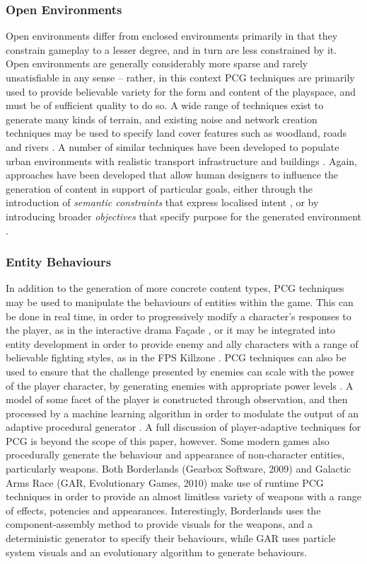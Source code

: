 \documentclass{acm_proc_article-sp}
\begin{document}
\subsubsection{Open Environments}
Open environments differ from enclosed environments primarily in that they constrain gameplay to a lesser degree, and in turn are less constrained by it. Open environments are generally considerably more sparse and rarely unsatisfiable in any sense -- rather, in this context PCG techniques are primarily used to provide believable variety for the form and content of the playspace, and must be of sufficient quality to do so. A wide range of techniques exist to generate many kinds of terrain, and existing noise and network creation techniques may be used to specify land cover features such as woodland, roads and rivers \cite{raffe2012survey,perlin2002improving}. A number of similar techniques have been developed to populate urban environments with realistic transport infrastructure and buildings \cite{carli2011survey}. Again, approaches have been developed that allow human designers to influence the generation of content in support of particular goals, either through the introduction of \textit{semantic constraints} that express localised intent \cite{smelik2011semantic}, or by introducing broader \textit{objectives} that specify purpose for the generated environment \cite{togelius2010towards}.


\subsubsection{Entity Behaviours}
\label{sec:GAR1}
In addition to the generation of more concrete content types, PCG techniques may be used to manipulate the behaviours of entities within the game. This can be done in real time, in order to progressively modify a character's responses to the player, as in the interactive drama Fa{\c{c}}ade \cite{mateas2007writing}, or it may be integrated into entity development in order to provide enemy and ally characters with a range of believable fighting styles, as in the FPS Killzone \cite{straatman2005killzone}.
PCG techniques can also be used to ensure that the challenge presented by enemies can scale with the power of the player character, by generating enemies with appropriate power levels \cite{hamlet}. A model of some facet of the player is constructed through observation, and then processed by a machine learning algorithm in order to modulate the output of an adaptive procedural generator \cite{lopes2011adaptivity}. A full discussion of player-adaptive techniques for PCG is beyond the scope of this paper, however.
Some modern games also procedurally generate the behaviour and appearance of non-character entities, particularly weapons. Both Borderlands (Gearbox Software, 2009) and Galactic Arms Race (GAR, Evolutionary Games, 2010) make use of runtime PCG techniques in order to provide an almost limitless variety of weapons with a range of effects, potencies and appearances. Interestingly, Borderlands uses the component-assembly method to provide visuals for the weapons, and a deterministic generator to specify their behaviours, while GAR uses particle system visuals and an evolutionary algorithm to generate behaviours.
\end{document}
